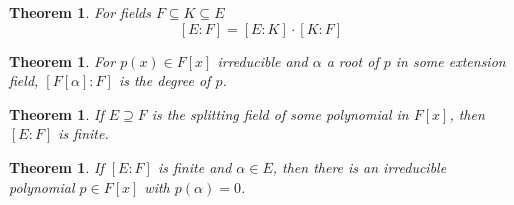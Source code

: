 \documentclass[12pt]{article}
\def\al{\alpha}
\def\al{\alpha}
\def\su{\subseteq}
\newtheorem{thm}[theorem]{Theorem}
\begin{document}
\begin{thm}
For fields $F\su K\su E$
$$[E:F]=[E:K]\cdot [K:F]$$
\end{thm}

\begin{thm}
For $p(x)\in F[x]$ irreducible and $\al$ a root of $p$ in
some extension field, $[F[\al]:F]$ is the degree of $p$.
\end{thm}

\begin{thm}
If $E\supseteq F$ is the splitting field of some polynomial in $F[x]$,
then $[E:F]$ is finite.
\end{thm}

\begin{thm}
If $[E:F]$ is finite and $\al\in E$, then there is an irreducible
polynomial $p\in F[x]$ with $p(\al)=0$.
\end{thm}
\end{document}
